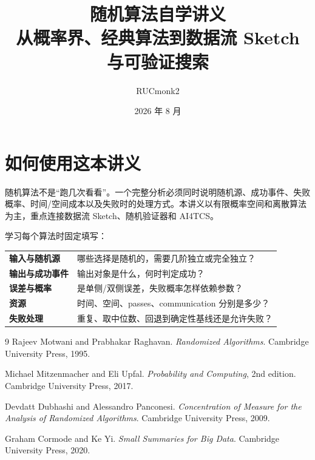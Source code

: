 \documentclass[UTF8,zihao=-4,oneside,fontset=fandol]{ctexrep}
\title{\heiti 随机算法自学讲义\\[0.5em]
\Large 从概率界、经典算法到数据流 Sketch 与可验证搜索}
\author{RUCmonk2}
\date{2026 年 8 月}
\theoremstyle{remark}
\begin{document}
\hypersetup{pageanchor=false}
\maketitle
\hypersetup{pageanchor=true}

\chapter*{如何使用这本讲义}

随机算法不是“跑几次看看”。一个完整分析必须同时说明随机源、成功事件、失败概率、时间/空间成本以及失败时的处理方式。本讲义以有限概率空间和离散算法为主，重点连接数据流 Sketch、随机验证器和 AI4TCS。

学习每个算法时固定填写：
\begin{center}
\begin{tabularx}{0.94\textwidth}{>{\bfseries}lX}
\toprule
输入与随机源 & 哪些选择是随机的，需要几阶独立或完全独立？\\
输出与成功事件 & 输出对象是什么，何时判定成功？\\
误差与概率 & 是单侧/双侧误差，失败概率怎样依赖参数？\\
资源 & 时间、空间、passes、communication 分别是多少？\\
失败处理 & 重复、取中位数、回退到确定性基线还是允许失败？\\
\bottomrule
\end{tabularx}
\end{center}

\tableofcontents
\clearpage









\begin{thebibliography}{9}
Rajeev Motwani and Prabhakar Raghavan.
\newblock \emph{Randomized Algorithms}.
\newblock Cambridge University Press, 1995.

Michael Mitzenmacher and Eli Upfal.
\newblock \emph{Probability and Computing}, 2nd edition.
\newblock Cambridge University Press, 2017.

Devdatt Dubhashi and Alessandro Panconesi.
\newblock \emph{Concentration of Measure for the Analysis of Randomized Algorithms}.
\newblock Cambridge University Press, 2009.

Graham Cormode and Ke Yi.
\newblock \emph{Small Summaries for Big Data}.
\newblock Cambridge University Press, 2020.
\end{thebibliography}
\end{document}
